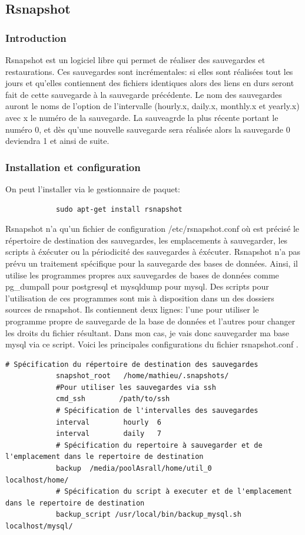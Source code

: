 \documentclass[a4paper]{report}
\begin{document}
		\subsection{Rsnapshot}
		\subsubsection{Introduction}
		Rsnapshot est un logiciel libre qui permet de réaliser des sauvegardes et restaurations. Ces sauvegardes sont incrémentales: si elles sont réalisées tout les jours et qu'elles contiennent des fichiers identiques alors des liens en durs seront fait de cette sauvegarde à la sauvegarde précédente. Le nom des sauvegardes auront le noms de l'option de l'intervalle (hourly.x, daily.x, monthly.x et yearly.x) avec x le numéro de la sauvegarde. La sauveagrde la plus récente portant le numéro 0, et dès qu'une nouvelle sauvegarde sera réalisée alors la sauvegarde 0 deviendra 1 et ainsi de suite. 
		\subsubsection{Installation et configuration}
		On peut l'installer via le gestionnaire de paquet:
		\begin{lstlisting}
			sudo apt-get install rsnapshot
		\end{lstlisting}
		Rsnapshot n'a qu'un fichier de configuration /etc/rsnapshot.conf où est précisé le répertoire de destination des sauvegardes, les emplacements à sauvegarder, les scripts à éxécuter ou la périodicité des sauvegardes à éxécuter. Rsnapshot n'a pas prévu un traitement spécifique pour la sauvegarde des bases de données. Ainsi, il utilise les programmes propres aux sauvegardes de bases de données comme pg\_dumpall pour postgresql et mysqldump pour mysql. Des scripts pour l'utilisation de ces programmes sont mis à disposition dans un des dossiers sources de rsnapshot. Ils contiennent deux lignes: l'une pour utiliser le programme propre de sauvegarde de la base de données et l'autres pour changer les droits du fichier résultant. Dans mon cas, je vais donc sauvegarder ma base mysql via ce script. Voici les principales configurations du fichier rsnapshot.conf .
		\begin{lstlisting}[language=ksh,texcl]
			# Spécification du répertoire de destination des sauvegardes
			snapshot_root   /home/mathieu/.snapshots/
			#Pour utiliser les sauvegardes via ssh
			cmd_ssh        /path/to/ssh
			# Spécification de l'intervalles des sauvegardes
			interval        hourly  6
			interval        daily   7
			# Spécification du repertoire à sauvegarder et de l'emplacement dans le repertoire de destination
			backup  /media/poolAsrall/home/util_0           localhost/home/
			# Spécification du script à executer et de l'emplacement dans le repertoire de destination
			backup_script /usr/local/bin/backup_mysql.sh localhost/mysql/
		\end{lstlisting}
\end{document}
